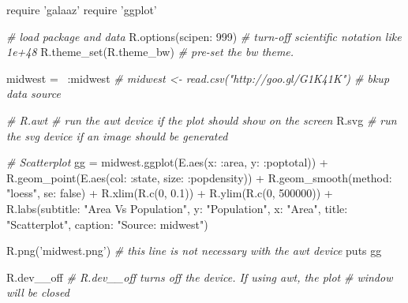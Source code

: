 \documentclass[]{article}
\newenvironment{Shaded}{\begin{snugshade}}{\end{snugshade}}
\newcommand{\DecValTok}[1]{\textcolor[rgb]{0.00,0.00,0.81}{#1}}
\newcommand{\FloatTok}[1]{\textcolor[rgb]{0.00,0.00,0.81}{#1}}
\newcommand{\StringTok}[1]{\textcolor[rgb]{0.31,0.60,0.02}{#1}}
\newcommand{\CommentTok}[1]{\textcolor[rgb]{0.56,0.35,0.01}{\textit{#1}}}
\newcommand{\NormalTok}[1]{#1}
\begin{document}
\begin{Shaded}
\begin{Highlighting}[]
\NormalTok{require }\StringTok{'galaaz'}
\NormalTok{require }\StringTok{'ggplot'}

\CommentTok{# load package and data}
\NormalTok{R.options(}\StringTok{scipen: }\DecValTok{999}\NormalTok{)  }\CommentTok{# turn-off scientific notation like 1e+48}
\NormalTok{R.theme_set(R.theme_bw)  }\CommentTok{# pre-set the bw theme.}

\NormalTok{midwest = ~}\StringTok{:midwest}
\CommentTok{# midwest <- read.csv("http://goo.gl/G1K41K")  # bkup data source}

\CommentTok{# R.awt  # run the awt device if the plot should show on the screen}
\NormalTok{R.svg    }\CommentTok{# run the svg device if an image should be generated}

\CommentTok{# Scatterplot}
\NormalTok{gg = midwest.ggplot(E.aes(}\StringTok{x: :area}\NormalTok{, }\StringTok{y: :poptotal}\NormalTok{)) + }
\NormalTok{     R.geom_point(E.aes(}\StringTok{col: :state}\NormalTok{, }\StringTok{size: :popdensity}\NormalTok{)) + }
\NormalTok{     R.geom_smooth(}\StringTok{method: "loess"}\NormalTok{, }\StringTok{se: }\DecValTok{false}\NormalTok{) + }
\NormalTok{     R.xlim(R.c(}\DecValTok{0}\NormalTok{, }\FloatTok{0.1}\NormalTok{)) + }
\NormalTok{     R.ylim(R.c(}\DecValTok{0}\NormalTok{, }\DecValTok{500000}\NormalTok{)) + }
\NormalTok{     R.labs(}\StringTok{subtitle: "Area Vs Population"}\NormalTok{, }
            \StringTok{y: "Population"}\NormalTok{, }
            \StringTok{x: "Area"}\NormalTok{, }
            \StringTok{title: "Scatterplot"}\NormalTok{, }
            \StringTok{caption: "Source: midwest"}\NormalTok{)}

\NormalTok{R.png(}\StringTok{'midwest.png'}\NormalTok{)     }\CommentTok{# this line is not necessary with the awt device}
\NormalTok{puts gg}

\NormalTok{R.dev__off               }\CommentTok{# R.dev__off turns off the device.  If using awt, the plot}
                         \CommentTok{# window will be closed}
\end{Highlighting}
\end{Shaded}
\end{document}

